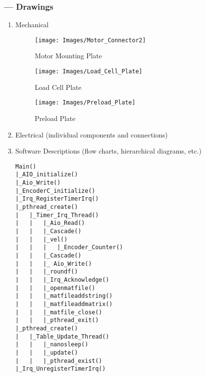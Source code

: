 \subsubsection*{ --- Drawings}
\begin{enumerate}
\item{Mechanical}

\begin{figure}[H]
\centering
\texttt{[image: Images/Motor\_Connector2]}
\caption{Motor Mounting Plate}
\label{fig:Motor_Connector2}
\end{figure}

\begin{figure}[H]
\centering
\texttt{[image: Images/Load\_Cell\_Plate]}
\caption{Load Cell Plate}
\label{fig:Load_Cell_Plate}
\end{figure}

\begin{figure}[H]
\centering
\texttt{[image: Images/Preload\_Plate]}
\caption{Preload Plate}
\label{fig:Preload_Plate}
\end{figure}


\item{Electrical (individual components and connections)}

\item{Software Descriptions (flow charts, hierarchical diagrams, etc.)}

\begin{verbatim}
Main()
|_AIO_initialize()
|_Aio_Write()
|_EncoderC_initialize()
|_Irq_RegisterTimerIrq()
|_pthread_create()
|	|_Timer_Irq_Thread()
|	|	|_Aio_Read()
|	|	|_Cascade()
|	|	|_vel()
|	|	|	|_Encoder_Counter()
|	|	|_Cascade()
|	|	|_ Aio_Write()
|	|	|_roundf()
|	|	|_Irq_Acknowledge()
|	|	|_openmatfile()
|	|	|_matfileaddstring()
|	|	|_matfileaddmatrix()
|	|	|_matfile_close()
|	|	|_pthread_exit()
|_pthread_create()
|	|_Table_Update_Thread()
|	|	|_nanosleep()
|	|	|_update()
|	|	|_pthread_exist()
|_Irq_UnregisterTimerIrq()
\end{verbatim}
\end{enumerate}